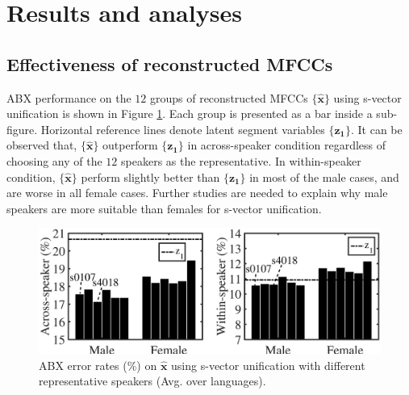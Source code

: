 \documentclass[a4paper]{article}
\begin{document}

\section{Results and analyses}

\subsection{Effectiveness of reconstructed MFCCs}
ABX performance on the $12$ groups of reconstructed MFCCs $\{\bm{\hat{x}}\}$ using s-vector unification is shown in Figure \ref{fig:recon_abx}. Each group 
is presented as a bar inside a sub-figure.
Horizontal reference lines denote latent segment variables $\{\bm{z_1}\}$.
It can be observed that,  $\{\bm{\hat{x}}\}$ outperform $\{\bm{z_1}\}$ in across-speaker condition  regardless of choosing any of the $12$ speakers as the representative. In within-speaker condition, $\{\bm{\hat{x}}\}$ perform slightly better than $\{\bm{z_1}\}$ in most of the male  cases, and are worse in all  female  cases. Further studies are needed to explain why male speakers are more suitable than females for s-vector unification.
\begin{figure}[t]
    \centering
    \includegraphics[width=0.9\linewidth]{recon_abx2_export_setup.eps}

    \caption{ABX error rates (\%) on $\bm{\hat{x}}$ using s-vector unification with different representative speakers (Avg. over languages).}
    \label{fig:recon_abx}
\end{figure}
\end{document}
